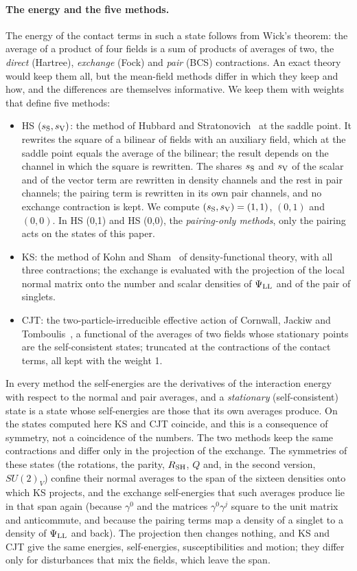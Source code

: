 \documentclass[aps,prd,twocolumn,superscriptaddress,nofootinbib,floatfix,longbibliography]{revtex4-2}
\newcommand{\LL}{{\rm LL}}
\newcommand{\SH}{{\rm SH}}
\begin{document}
\paragraph*{The energy and the five methods.}
The energy of the contact terms in such a state follows from Wick's theorem: the average of a product of four fields
is a sum of products of averages of two, the \emph{direct} (Hartree), \emph{exchange} (Fock) and \emph{pair} (BCS)
contractions. An exact theory would keep them all, but the mean-field methods differ in which they keep and how, and
the differences are themselves informative. We keep them with weights that define five methods:
\begin{itemize}
\item HS $(s_{\rm S},s_{\rm V})$: the method of Hubbard and Stratonovich~\cite{Hubbard1959,Stratonovich1957} at the
saddle point. It rewrites the square of a bilinear of fields with an auxiliary field, which at the saddle point equals
the average of the bilinear; the result depends on the channel in which the square is rewritten. The shares $s_{\rm S}$
and $s_{\rm V}$ of the scalar and of the vector term are rewritten in density channels and the rest in pair channels;
the pairing term is rewritten in its own pair channels, and no exchange contraction is kept. We compute $(s_{\rm
S},s_{\rm V})=(1,1)$, $(0,1)$ and $(0,0)$. In HS (0,1) and HS (0,0), the \emph{pairing-only methods}, only the pairing
acts on the states of this paper.
\item KS: the method of Kohn and Sham~\cite{HohenbergKohn1964,KohnSham1965} of density-functional theory, with all three
contractions; the exchange is evaluated with the projection of the local normal matrix onto the number and scalar
densities of $\Psi_\LL$ and of the pair of singlets.
\item CJT: the two-particle-irreducible effective action of Cornwall, Jackiw and Tomboulis~\cite{CJT1974}, a functional of
the averages of two fields whose stationary points are the self-consistent states; truncated at the contractions of the
contact terms, all kept with the weight 1.
\end{itemize}
In every method the self-energies are the derivatives of the interaction energy with respect to the normal and pair
averages, and a \emph{stationary} (self-consistent) state is a state whose self-energies are those that its own averages
produce. On the states computed here KS and CJT coincide, and this is a consequence of symmetry, not a coincidence of the
numbers. The two methods keep the same contractions and differ only in the projection of the exchange. The symmetries of
these states (the rotations, the parity, $R_\SH$, $Q$ and, in the second version, $SU(2)_V$) confine their normal
averages to the span of the sixteen densities onto which KS projects, and the exchange self-energies that such averages
produce lie in that span again (because $\gamma^0$ and the matrices $\gamma^0\gamma^j$ square to the unit matrix and
anticommute, and because the pairing terms map a density of a singlet to a density of $\Psi_\LL$ and back). The projection
then changes nothing, and KS and CJT give the same energies, self-energies, susceptibilities and motion; they differ
only for disturbances that mix the fields, which leave the span.
\end{document}
